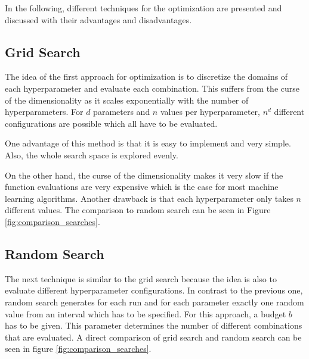 In the following, different techniques for the optimization are presented and discussed with their advantages and disadvantages.

\subsection{Grid Search}
The idea of the first approach for optimization is to discretize the domains of each hyperparameter and evaluate each combination. This suffers from the curse of the dimensionality as it scales exponentially with the number of hyperparameters. For $ d $ parameters and $ n $ values per hyperparameter, $ n^d $ different configurations are possible which all have to be evaluated. 

One advantage of this method is that it is easy to implement and very simple. Also, the whole search space is explored evenly.

On the other hand, the curse of the dimensionality makes it very slow if the function evaluations are very expensive which is the case for most machine learning algorithms. Another drawback is that each hyperparameter only takes $ n $ different values. The comparison to random search can be seen in Figure \ref{fig:comparison_searches}.


\subsection{Random Search} \label{Random_search}
The next technique \cite{random_search} is similar to the grid search because the idea is also to evaluate different hyperparameter configurations. In contrast to the previous one, random search generates for each run and for each parameter exactly one random value from an interval which has to be specified. For this approach, a budget $ b $ has to be given. This parameter determines the number of different combinations that are evaluated. A direct comparison of grid search and random search can be seen in figure \ref{fig:comparison_searches}.

